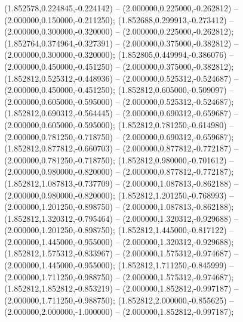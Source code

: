  (1.852578,0.224845,-0.224142) -- (2.000000,0.225000,-0.262812) -- (2.000000,0.150000,-0.211250);
 (1.852688,0.299913,-0.273412) -- (2.000000,0.300000,-0.320000) -- (2.000000,0.225000,-0.262812);
 (1.852764,0.374964,-0.327391) -- (2.000000,0.375000,-0.382812) -- (2.000000,0.300000,-0.320000);
 (1.852805,0.449994,-0.386076) -- (2.000000,0.450000,-0.451250) -- (2.000000,0.375000,-0.382812);
 (1.852812,0.525312,-0.448936) -- (2.000000,0.525312,-0.524687) -- (2.000000,0.450000,-0.451250);
 (1.852812,0.605000,-0.509097) -- (2.000000,0.605000,-0.595000) -- (2.000000,0.525312,-0.524687);
 (1.852812,0.690312,-0.564445) -- (2.000000,0.690312,-0.659687) -- (2.000000,0.605000,-0.595000);
 (1.852812,0.781250,-0.614980) -- (2.000000,0.781250,-0.718750) -- (2.000000,0.690312,-0.659687);
 (1.852812,0.877812,-0.660703) -- (2.000000,0.877812,-0.772187) -- (2.000000,0.781250,-0.718750);
 (1.852812,0.980000,-0.701612) -- (2.000000,0.980000,-0.820000) -- (2.000000,0.877812,-0.772187);
 (1.852812,1.087813,-0.737709) -- (2.000000,1.087813,-0.862188) -- (2.000000,0.980000,-0.820000);
 (1.852812,1.201250,-0.768993) -- (2.000000,1.201250,-0.898750) -- (2.000000,1.087813,-0.862188);
 (1.852812,1.320312,-0.795464) -- (2.000000,1.320312,-0.929688) -- (2.000000,1.201250,-0.898750);
 (1.852812,1.445000,-0.817122) -- (2.000000,1.445000,-0.955000) -- (2.000000,1.320312,-0.929688);
 (1.852812,1.575312,-0.833967) -- (2.000000,1.575312,-0.974687) -- (2.000000,1.445000,-0.955000);
 (1.852812,1.711250,-0.845999) -- (2.000000,1.711250,-0.988750) -- (2.000000,1.575312,-0.974687);
 (1.852812,1.852812,-0.853219) -- (2.000000,1.852812,-0.997187) -- (2.000000,1.711250,-0.988750);
 (1.852812,2.000000,-0.855625) -- (2.000000,2.000000,-1.000000) -- (2.000000,1.852812,-0.997187);
